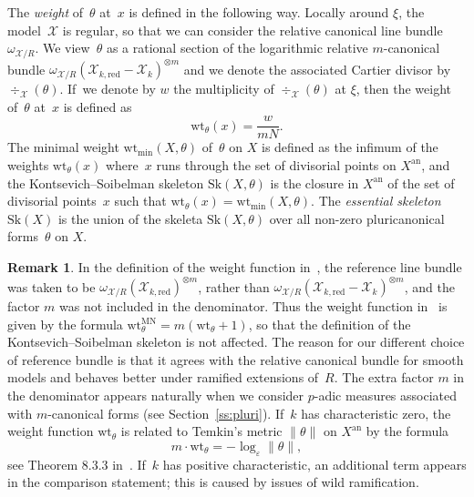 \documentclass[JEP,XML,SOM,Unicode,NoFloatCountersInSection]{cedram}
\theoremstyle{definition}
\newtheorem{remark}[equation]{Remark}
\numberwithin{equation}{subsection}
\newcommand{\cX}{\ensuremath{\mathscr{X}}}
\newcommand{\an}{\mathrm{an}}
\newcommand{\red}{\mathrm{red}}
\newcommand{\Sk}{\mathrm{Sk}}
\newcommand{\wt}{\mathrm{wt}}
\let\form\theta
\begin{document}
The {\em weight} of~$\form$ at~$x$ is defined in the following way. Locally around $\xi$, the model~$\cX$ is regular, so that we can consider the relative canonical line bundle $\omega_{\cX/R}$. We view~$\form$ as a rational section of the logarithmic relative $m$-canonical bundle
\hbox{$\omega_{\cX/R}(\cX_{k,\red}-\cX_k)^{\otimes m}$} and we denote the associated Cartier divisor by $\div_{\cX}(\form)$. If~we denote by $w$ the multiplicity of $\div_{\cX}(\form)$ at $\xi$, then the weight of~$\form$ at~$x$ is defined as
\[
\wt_{\form}(x)=\frac{w}{mN}.
\]
The minimal weight $\wt_{\min}(X,\form)$ of~$\form$ on $X$ is defined as
the infimum of the weights $\wt_{\form}(x)$ where~$x$ runs through the set of divisorial points on $X^{\an}$, and the Kontsevich--Soibelman skeleton $\Sk(X,\form)$
is the closure in $X^{\an}$ of the set of divisorial points~$x$ such that $\wt_{\form}(x)=\wt_{\min}(X,\form)$. The {\em essential skeleton} $\Sk(X)$ is the union of the skeleta $\Sk(X,\form)$ over all non-zero
pluricanonical forms~$\form$ on $X$.

\begin{remark}\label{rema:weight}
In the definition of the weight function in~\cite{MuNi}, the reference line bundle was taken to be $\omega_{\cX/R}(\cX_{k,\red})^{\otimes m}$, rather than $\omega_{\cX/R}(\cX_{k,\red}-\cX_k)^{\otimes m}$, and the factor $m$ was not included in the denominator. Thus the weight function in~\cite{MuNi} is given by the formula $\wt^{\mathrm{MN}}_{\form}=m(\wt_{\form}+1)$, so that the definition of the Kontsevich--Soibelman skeleton is not affected. The reason for our different choice of reference bundle is that it agrees with the relative canonical bundle for smooth models and behaves better under ramified extensions of~$R$. The extra factor $m$ in the denominator appears naturally when we consider $p$-adic measures associated with $m$-canonical forms (see Section~\ref{ss:pluri}). If~$k$ has characteristic zero, the weight function $\wt_{\form}$ is related to Temkin's metric $\|\form\|$ on $X^{\an}$ by the formula
\[
m\cdot \wt_{\form}=-\log_{\varepsilon}\|\form\|,
\]
see Theorem 8.3.3 in~\cite{temkin}. If~$k$ has positive characteristic, an additional term appears in the comparison statement; this is caused by issues of wild ramification.
\end{remark}
\end{document}
